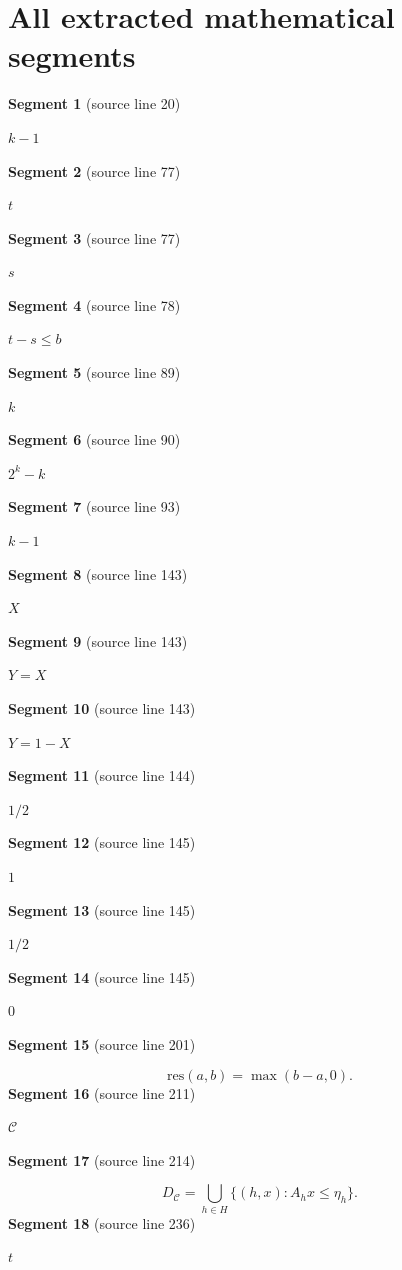 \documentclass[11pt]{article}
\begin{document}
\section*{All extracted mathematical segments}
\textbf{Segment 1} (source line 20)\par
\( k-1 \)\par
\textbf{Segment 2} (source line 77)\par
\( t \)\par
\textbf{Segment 3} (source line 77)\par
\( s \)\par
\textbf{Segment 4} (source line 78)\par
\( t-s\le b \)\par
\textbf{Segment 5} (source line 89)\par
\( k \)\par
\textbf{Segment 6} (source line 90)\par
\( 2^k-k \)\par
\textbf{Segment 7} (source line 93)\par
\( k-1 \)\par
\textbf{Segment 8} (source line 143)\par
\( X \)\par
\textbf{Segment 9} (source line 143)\par
\( Y=X \)\par
\textbf{Segment 10} (source line 143)\par
\( Y=1-X \)\par
\textbf{Segment 11} (source line 144)\par
\( 1/2 \)\par
\textbf{Segment 12} (source line 145)\par
\( 1 \)\par
\textbf{Segment 13} (source line 145)\par
\( 1/2 \)\par
\textbf{Segment 14} (source line 145)\par
\( 0 \)\par
\textbf{Segment 15} (source line 201)\par
\[
\mathrm{res}(a,b)=\max(b-a,0).
\]
\textbf{Segment 16} (source line 211)\par
\( \mathcal C \)\par
\textbf{Segment 17} (source line 214)\par
\[
D_{\mathcal C}
 =\bigcup_{h\in H}\{(h,x):A_hx\le \eta_h\}.
\]
\textbf{Segment 18} (source line 236)\par
\( t \)\par
\end{document}
